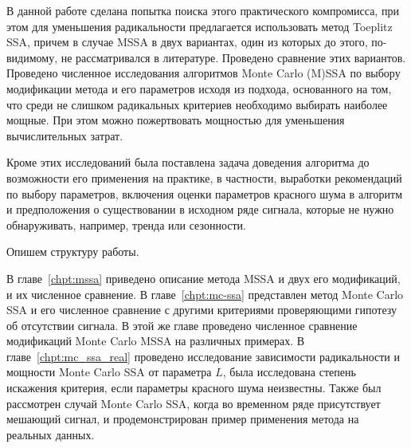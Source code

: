 \documentclass[specialist,
substylefile = spbu_report.rtx,
subf,href,colorlinks=true, 12pt]{disser}
\theoremstyle{definition}
\begin{document}

 В данной работе сделана попытка поиска этого практического компромисса, при этом для уменьшения радикальности предлагается использовать метод Toeplitz SSA, причем в случае MSSA в двух вариантах, один из которых до этого, по-видимому, не рассматривался в литературе.
 Проведено сравнение этих вариантов.
 Проведено численное исследования алгоритмов Monte Carlo (M)SSA по выбору модификации метода и его параметров исходя из подхода, основанного на том, что среди не слишком радикальных критериев необходимо выбирать наиболее мощные. При этом можно пожертвовать мощностью для уменьшения вычислительных затрат.

 Кроме этих исследований была поставлена задача доведения алгоритма до возможности его применения на практике, в частности, выработки рекомендаций по выбору параметров, включения оценки параметров красного шума в алгоритм и предположения о существовании в исходном ряде сигнала, которые не нужно обнаруживать, например, тренда или сезонности.
%

Опишем структуру работы.

В главе~\ref{chpt:mssa} приведено описание метода MSSA и двух его модификаций, и их численное сравнение. В главе~\ref{chpt:mc-ssa} представлен метод Monte Carlo SSA и его численное сравнение с другими критериями проверяющими гипотезу об отсутствии сигнала. В этой же главе проведено численное сравнение модификаций Monte Carlo MSSA на различных примерах. В главе~\ref{chpt:mc_ssa_real} проведено исследование зависимости радикальности и мощности Monte Carlo SSA от параметра $L$, была исследована степень искажения критерия, если параметры красного шума неизвестны. Также был рассмотрен случай Monte Carlo SSA, когда во временном ряде присутствует мешающий сигнал, и продемонстрирован пример применения метода на реальных данных.
\end{document}

